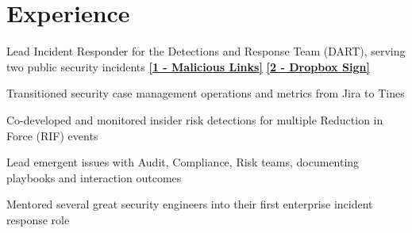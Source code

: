 \documentclass[letterpaper]{deedy-resume} %
\begin{document}
\begin{minipage}[t]{0.66\textwidth} %


\section{Experience}


\vspace{\topsep} %
\begin{tightitemize}
\item Lead Incident Responder for the Detections and Response Team (DART), serving two public security incidents \textbf{\href{https://dropbox.tech/security/changing-how-we-identify-malicious-urls-in-shared-documents}{[1 - Malicious Links]}} \textbf{\href{https://sign.dropbox.com/blog/a-recent-security-incident-involving-dropbox-sign}{[2 - Dropbox Sign]}}
\item Transitioned security case management operations and metrics from Jira to Tines
\item Co-developed and monitored insider risk detections for multiple Reduction in Force (RIF) events
\item Lead emergent issues with Audit, Compliance, Risk teams, documenting playbooks and interaction outcomes
\item Mentored several great security engineers into their first enterprise incident response role
\end{tightitemize}

\sectionspace %




\end{minipage}
\end{document}
